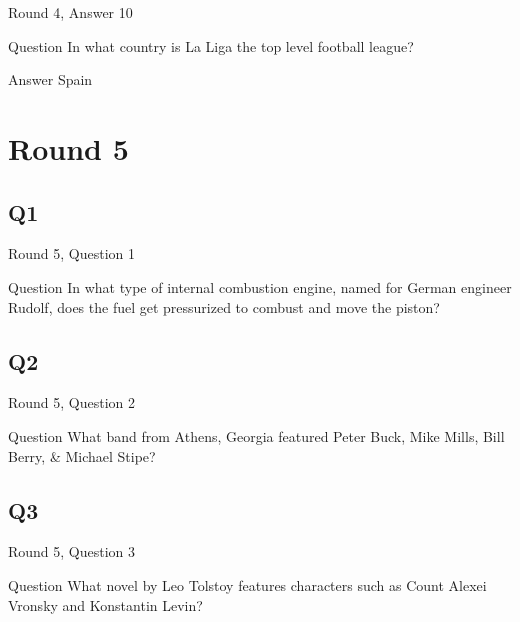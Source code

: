 \documentclass[11pt]{beamer}
\begin{document}
\begin{frame}[t]{Round 4, Answer 10}
\vspace{2em}
\begin{block}{Question}
In what country is La Liga the top level football league\@?
\end{block}
\pause{}
\begin{block}{Answer}
Spain
\end{block}
\end{frame}
    

\section{Round 5}
    

\subsection*{Q1}
\begin{frame}[t]{Round 5, Question 1}
\vspace{2em}
\begin{block}{Question}
In what type of internal combustion engine, named for German engineer Rudolf, does the fuel get pressurized to combust and move the piston\@?
\end{block}
\end{frame}
    

\subsection*{Q2}
\begin{frame}[t]{Round 5, Question 2}
\vspace{2em}
\begin{block}{Question}
What band from Athens, Georgia featured Peter Buck, Mike Mills, Bill Berry, \& Michael Stipe\@?
\end{block}
\end{frame}
    

\subsection*{Q3}
\begin{frame}[t]{Round 5, Question 3}
\vspace{2em}
\begin{block}{Question}
What novel by Leo Tolstoy features characters such as Count Alexei Vronsky and Konstantin Levin\@?
\end{block}
\end{frame}
    
\end{document}

